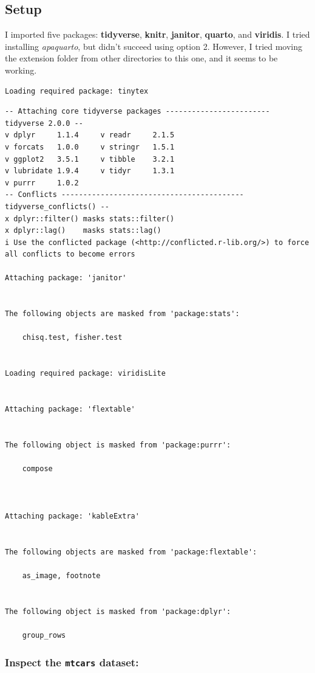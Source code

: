 \documentclass[
  man,
  floatsintext,
  longtable,
  nolmodern,
  notxfonts,
  notimes,
  colorlinks=true,linkcolor=blue,citecolor=blue,urlcolor=blue]{apa7}
\begin{document}
\subsection{Setup}\label{setup}

I imported five packages: \textbf{tidyverse}, \textbf{knitr},
\textbf{janitor}, \textbf{quarto}, and \textbf{viridis}. I tried
installing \emph{apaquarto}, but didn't succeed using option 2. However,
I tried moving the extension folder from other directories to this one,
and it seems to be working.

\begin{verbatim}
Loading required package: tinytex
\end{verbatim}

\begin{verbatim}
-- Attaching core tidyverse packages ------------------------ tidyverse 2.0.0 --
v dplyr     1.1.4     v readr     2.1.5
v forcats   1.0.0     v stringr   1.5.1
v ggplot2   3.5.1     v tibble    3.2.1
v lubridate 1.9.4     v tidyr     1.3.1
v purrr     1.0.2     
-- Conflicts ------------------------------------------ tidyverse_conflicts() --
x dplyr::filter() masks stats::filter()
x dplyr::lag()    masks stats::lag()
i Use the conflicted package (<http://conflicted.r-lib.org/>) to force all conflicts to become errors

Attaching package: 'janitor'


The following objects are masked from 'package:stats':

    chisq.test, fisher.test


Loading required package: viridisLite


Attaching package: 'flextable'


The following object is masked from 'package:purrr':

    compose



Attaching package: 'kableExtra'


The following objects are masked from 'package:flextable':

    as_image, footnote


The following object is masked from 'package:dplyr':

    group_rows
\end{verbatim}

\subsubsection{\texorpdfstring{Inspect the \texttt{mtcars}
dataset:}{Inspect the mtcars dataset:}}\label{inspect-the-mtcars-dataset}
\end{document}
